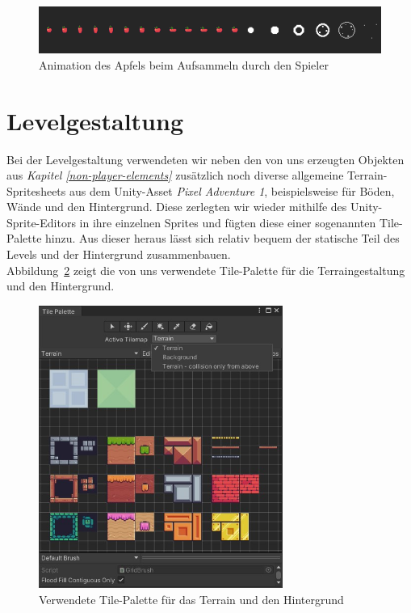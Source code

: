 \begin{figure}[th]
\centering
\includegraphics[width=150mm]{Figures/apple_collected.png}
\decoRule
\caption[Animation des Apfels beim Aufsammeln durch den Spieler]{Animation des Apfels beim Aufsammeln durch den Spieler}
\label{fig:apple-collected}
\end{figure}
\newpage

\section{Levelgestaltung}

Bei der Levelgestaltung verwendeten wir neben den von uns erzeugten Objekten aus \textit{Kapitel \ref{non-player-elements} } zusätzlich noch diverse allgemeine Terrain-Spritesheets aus dem Unity-Asset \textit{Pixel Adventure 1}, beispielsweise für Böden, Wände und den Hintergrund. Diese zerlegten wir wieder mithilfe des Unity-Sprite-Editors in ihre einzelnen Sprites und fügten diese einer sogenannten Tile-Palette hinzu. Aus dieser heraus lässt sich relativ bequem der statische Teil des Levels und der Hintergrund zusammenbauen.\\

Abbildung~\ref{fig:tile-palette} zeigt die von uns verwendete Tile-Palette für die Terraingestaltung und den Hintergrund.\\

\begin{figure}[th]
\centering
\includegraphics[width=80mm]{Figures/tile-palette.jpg}
\decoRule
\caption[Verwendete Tile-Palette für das Terrain den Hintergrund]{Verwendete Tile-Palette für das Terrain und den Hintergrund}
\label{fig:tile-palette}
\end{figure}

